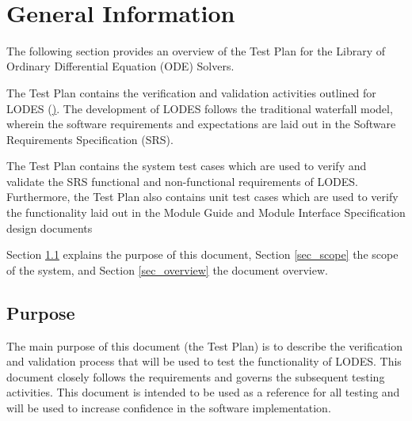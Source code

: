 \documentclass[12pt, titlepage]{article}
\newcommand{\famname}{LODES} %
\begin{document}
~\newpage

\tableofcontents

\listoftables


\newpage



\section{General Information}
The following section provides an overview of the Test Plan for the Library of Ordinary Differential Equation (ODE) 
Solvers.\\  
  
The Test Plan contains the verification and validation activities outlined for LODES (\href{https://github.com/aoananp/cas741}).
The development of LODES follows the traditional waterfall model, wherein the software requirements and
expectations are laid out in the Software Requirements Specification (SRS).

The Test Plan contains the
system test cases which are used to verify and validate the SRS functional and non-functional requirements of
LODES. Furthermore, the Test Plan also contains unit test cases which are used to verify the functionality
laid out in the Module Guide and Module Interface Specification design documents

Section \ref{sec_purpose} explains the purpose of this document,
Section \ref{sec_scope} the scope of the system,
and Section \ref{sec_overview} the document overview.


\subsection{Purpose} \label{sec_purpose}
The main purpose of this document (the Test Plan) is to describe the verification and validation process that will 
be used to test the functionality of \famname{}.  This document closely follows the requirements and governs
the subsequent testing activities. This document is intended to be used as a reference for all testing and will be
used to increase confidence in the 
software implementation.   
\end{document}
